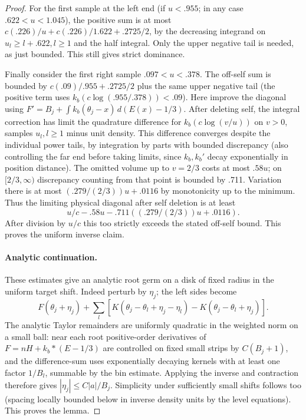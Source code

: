 \begin{proof}
For the first sample at the left end (if \(u<.955\); in any case \(.622<u<1.045\)), the positive sum is at most \(c(.226)/u+c(.226)/1.622+.2725/2\), by the decreasing integrand on \(u_l\ge l+.622, l\ge1\) and the half integral. Only the upper negative tail is needed, as just bounded. This still gives strict dominance.

Finally consider the first right sample \(.097<u<.378\). The off-self sum is bounded by \(c(.09)/.955+.2725/2\) plus the same upper negative tail (the positive term uses \(k_b(c\log(.955/.378))<.09\)). Here improve the diagonal using
\(F'=B_j+\int k_b(\theta_j-x)\,d(E(x)-1/3)\).
After deleting self, the integral correction has limit the quadrature difference for \(k_b(c\log(v/u))\) on \(v>0\), samples \(u_l,l\ge1\) minus unit density. This difference converges despite the individual power tails, by integration by parts with bounded discrepancy (also controlling the far end before taking limits, since \(k_b,k_b'\) decay exponentially in position distance). The omitted volume up to \(v=2/3\) costs at most \(.58u\); on \([2/3,\infty)\) discrepancy counting from that point is bounded by .711. Variation there is at most \((.279/(2/3))u+.0116\) by monotonicity up to the minimum. Thus the limiting physical diagonal after self deletion is at least
\[
 u/c-.58u-.711((.279/(2/3))u+.0116).
\]
After division by \(u/c\) this too strictly exceeds the stated off-self bound. This proves the uniform inverse claim.

\paragraph{Analytic continuation.}
These estimates give an analytic root germ on a disk of fixed radius in the uniform target shift. Indeed perturb by \(\eta_j\); the left sides become
\[
 F(\theta_j+\eta_j)+
 \sum_l [K(\theta_j-\theta_l+\eta_j-\eta_l)-K(\theta_j-\theta_l+\eta_j)].
\]
The analytic Taylor remainders are uniformly quadratic in the weighted norm on a small ball: near each root positive-order derivatives of \(F=nH+k_b*(E-1/3)\) are controlled on fixed small strips by \(C(B_j+1)\), and the difference-sum uses exponentially decaying kernels with at least one factor \(1/B_l\), summable by the bin estimate. Applying the inverse and contraction therefore gives \(|\eta_j|\le C|a|/B_j\). Simplicity under sufficiently small shifts follows too (spacing locally bounded below in inverse density units by the level equations). This proves the lemma.
\end{proof}


